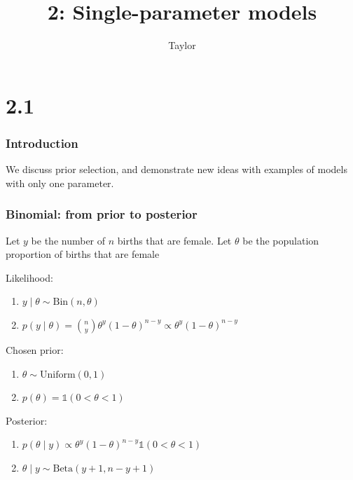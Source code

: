 \documentclass{beamer}
\title["2"]{2: Single-parameter models}
\author{Taylor}
\institute[UVA] 
{
University of Virginia \\
\medskip
\textit{} 
}
\date{}
\begin{document}

\begin{frame}
\titlepage 
\end{frame}

\section{2.1}

\begin{frame}
\frametitle{Introduction}

We discuss prior selection, and demonstrate new ideas with examples of models with only one parameter.


\end{frame}



\begin{frame}
\frametitle{Binomial: from prior to posterior}

Let $y$ be the number of $n$ births that are female. Let $\theta$ be the population proportion of births that are female 
\newline

Likelihood:
\begin{enumerate}
\item $y \mid \theta \sim \text{Bin}(n, \theta)$
\item $p(y \mid \theta) = \binom{n}{y} \theta^y (1-\theta)^{n-y} \propto \theta^y (1-\theta)^{n-y}$
\end{enumerate}

Chosen prior:
\begin{enumerate}
\item $\theta \sim \text{Uniform}(0,1)$
\item $p(\theta) = \mathbb{1}(0 < \theta < 1 )$
\end{enumerate}
\pause

Posterior:
\begin{enumerate}
\item $p(\theta \mid y) \propto \theta^y (1-\theta)^{n-y}\mathbb{1}(0 < \theta < 1 )$
\item $\theta \mid y \sim \text{Beta}(y+1, n-y+1)$
\end{enumerate}

\end{frame}
\end{document}
